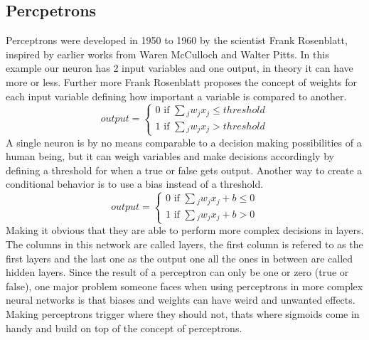 \subsection{Percpetrons}
Perceptrons were developed in 1950 to 1960 by the scientist Frank Rosenblatt, inspired by earlier works from Waren McCulloch and Walter Pitts.
In this example our neuron has 2 input variables and one output, in theory it can have more or less. Further more Frank Rosenblatt proposes the concept of weights for each input variable defining how important a variable is compared to another.
\newline
\begin{equation*}
    output=
    \begin{cases}
        0 \text{ if } \sum{_j}{w_jx_j \le threshold}\\
        1 \text{ if } \sum{_j}{w_jx_j > threshold}
    \end{cases}
\end{equation*}
\newpage
\noindent
A single neuron is by no means comparable to a decision making possibilities of a human being, but it can weigh variables and make decisions accordingly by defining a threshold for when a true or false gets output. Another way to create a conditional behavior is to use a bias instead of a threshold. 
\newline
\begin{equation*}
    output=
    \begin{cases}
        0 \text{ if } \sum{_j}{w_jx_j+b \le 0}\\
        1 \text{ if } \sum{_j}{w_jx_j+b > 0}
    \end{cases}
\end{equation*}
\newline
Making it obvious that they are able to perform more complex decisions in layers.
The columns in this network are called layers, the first column is refered to as the first layers and the last one as the output one all the
ones in between are called hidden layers. 
\newline
Since the result of a perceptron can only be one or zero (true or false), one major problem someone faces when using perceptrons in more complex neural networks is that biases and weights can have weird and unwanted effects. Making perceptrons trigger where they should not, thats where sigmoids come in handy and build on top of the concept of perceptrons.

